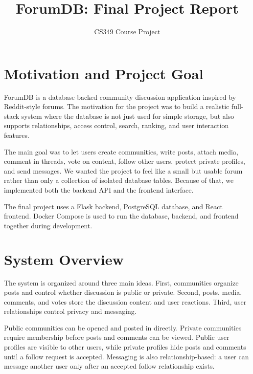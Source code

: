 \documentclass[11pt]{article}
\title{\vspace{-1.5em}\textbf{ForumDB: Final Project Report}}
\author{CS349 Course Project}
\date{}
\begin{document}
\maketitle
\vspace{-1.2em}

\section{Motivation and Project Goal}

ForumDB is a database-backed community discussion application inspired by Reddit-style forums. The motivation for the project was to build a realistic full-stack system where the database is not just used for simple storage, but also supports relationships, access control, search, ranking, and user interaction features.

The main goal was to let users create communities, write posts, attach media, comment in threads, vote on content, follow other users, protect private profiles, and send messages. We wanted the project to feel like a small but usable forum rather than only a collection of isolated database tables. Because of that, we implemented both the backend API and the frontend interface.

The final project uses a Flask backend, PostgreSQL database, and React frontend. Docker Compose is used to run the database, backend, and frontend together during development.

\section{System Overview}

The system is organized around three main ideas. First, communities organize posts and control whether discussion is public or private. Second, posts, media, comments, and votes store the discussion content and user reactions. Third, user relationships control privacy and messaging.

Public communities can be opened and posted in directly. Private communities require membership before posts and comments can be viewed. Public user profiles are visible to other users, while private profiles hide posts and comments until a follow request is accepted. Messaging is also relationship-based: a user can message another user only after an accepted follow relationship exists.
\end{document}
